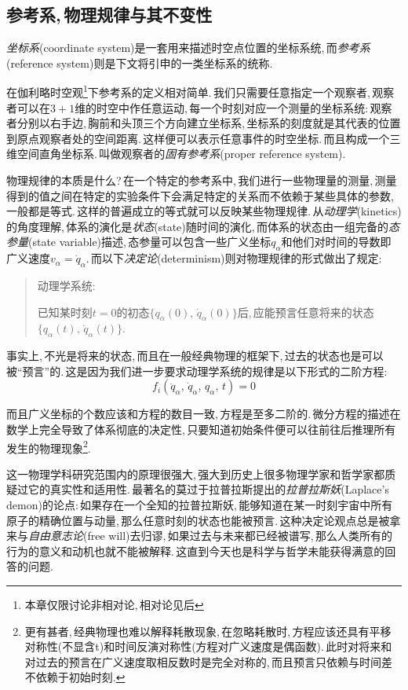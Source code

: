 \subsection{参考系,\,物理规律与其不变性}

\emph{坐标系}(coordinate system)是一套用来描述时空点位置的坐标系统,\,而\emph{参考系}(reference system)则是下文将引申的一类坐标系的统称.

在伽利略时空观\footnote{本章仅限讨论非相对论,\,相对论见后}下参考系的定义相对简单.\,我们只需要任意指定一个观察者,\,观察者可以在$3+1$维的时空中作任意运动,\,每一个时刻对应一个测量的坐标系统:\,观察者分别以右手边,\,胸前和头顶三个方向建立坐标系,\,坐标系的刻度就是其代表的位置到原点观察者处的空间距离.\,这样便可以表示任意事件的时空坐标.\,而且构成一个三维空间直角坐标系.\,叫做观察者的\emph{固有参考系}(proper reference system).

物理规律的本质是什么?\,在一个特定的参考系中,\,我们进行一些物理量的测量,\,测量得到的值之间在特定的实验条件下会满足特定的关系而不依赖于某些具体的参数,\,一般都是等式.\,这样的普遍成立的等式就可以反映某些物理规律.\,从\emph{动理学}(kinetics)的角度理解,\,体系的演化是\emph{状态}(state)随时间的演化,\,而体系的状态由一组完备的\emph{态参量}(state variable)描述,\,态参量可以包含一些广义坐标$q_\alpha$和他们对时间的导数即广义速度$v_\alpha=\dot{q}_\alpha$.\,而以下\emph{决定论}(determinism)则对物理规律的形式做出了规定:
\begin{quote}
动理学系统:

已知某时刻$t=0$的初态$\{q_\alpha(0),\,\dot{q}_\alpha(0)\}$后,\,应能预言任意将来的状态$\{q_\alpha(t),\,\dot{q}_\alpha(t)\}$.
\end{quote}

事实上,\,不光是将来的状态,\,而且在一般经典物理的框架下,\,过去的状态也是可以被``预言''的.\,这是因为我们进一步要求动理学系统的规律是以下形式的二阶方程:
\[f_i(\ddot{q}_\alpha,\,\dot{q}_\alpha,\,{q}_\alpha,\,t)=0\]

而且广义坐标的个数应该和方程的数目一致,\,方程是至多二阶的.\,微分方程的描述在数学上完全导致了体系彻底的决定性,\,只要知道初始条件便可以往前往后推理所有发生的物理现象\footnote{更有甚者,\,经典物理也难以解释耗散现象,\,在忽略耗散时,\,方程应该还具有平移对称性(不显含t)和时间反演对称性(方程对广义速度是偶函数).\,此时对将来和对过去的预言在广义速度取相反数时是完全对称的,\,而且预言只依赖与时间差不依赖于初始时刻.}.

这一物理学科研究范围内的原理很强大,\,强大到历史上很多物理学家和哲学家都质疑过它的真实性和适用性.\,最著名的莫过于拉普拉斯提出的\emph{拉普拉斯妖}(Laplace's demon)的论点:\,如果存在一个全知的拉普拉斯妖,\,能够知道在某一时刻宇宙中所有原子的精确位置与动量,\,那么任意时刻的状态也能被预言.\,这种决定论观点总是被拿来与\emph{自由意志论}(free will)去归谬,\,如果过去与未来都已经被谱写,\,那么人类所有的行为的意义和动机也就不能被解释.\,这直到今天也是科学与哲学未能获得满意的回答的问题.

